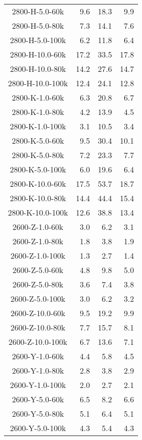 \begin{longtable}{crrr}
    2800-H-5.0-60k &   9.6 &   18.3 &   9.9 \\
    2800-H-5.0-80k &   7.3 &   14.1 &   7.6 \\
    2800-H-5.0-100k &   6.2 &   11.8 &   6.4 \\
    2800-H-10.0-60k &  17.2 &   33.5 &  17.8 \\
    2800-H-10.0-80k &  14.2 &   27.6 &  14.7 \\
    2800-H-10.0-100k &  12.4 &   24.1 &  12.8 \\
    2800-K-1.0-60k &   6.3 &   20.8 &   6.7 \\
    2800-K-1.0-80k &   4.2 &   13.9 &   4.5 \\
    2800-K-1.0-100k &   3.1 &   10.5 &   3.4 \\
    2800-K-5.0-60k &   9.5 &   30.4 &  10.1 \\
    2800-K-5.0-80k &   7.2 &   23.3 &   7.7 \\
    2800-K-5.0-100k &   6.0 &   19.6 &   6.4 \\
    2800-K-10.0-60k &  17.5 &   53.7 &  18.7 \\
    2800-K-10.0-80k &  14.4 &   44.4 &  15.4 \\
    2800-K-10.0-100k &  12.6 &   38.8 &  13.4 \\
    2600-Z-1.0-60k &   3.0 &    6.2 &   3.1 \\
    2600-Z-1.0-80k &   1.8 &    3.8 &   1.9 \\
    2600-Z-1.0-100k &   1.3 &    2.7 &   1.4 \\
    2600-Z-5.0-60k &   4.8 &    9.8 &   5.0 \\
    2600-Z-5.0-80k &   3.6 &    7.4 &   3.8 \\
    2600-Z-5.0-100k &   3.0 &    6.2 &   3.2 \\
    2600-Z-10.0-60k &   9.5 &   19.2 &   9.9 \\
    2600-Z-10.0-80k &   7.7 &   15.7 &   8.1 \\
    2600-Z-10.0-100k &   6.7 &   13.6 &   7.1 \\
    2600-Y-1.0-60k &   4.4 &    5.8 &   4.5 \\
    2600-Y-1.0-80k &   2.8 &    3.8 &   2.9 \\
    2600-Y-1.0-100k &   2.0 &    2.7 &   2.1 \\
    2600-Y-5.0-60k &   6.5 &    8.2 &   6.6 \\
    2600-Y-5.0-80k &   5.1 &    6.4 &   5.1 \\
    2600-Y-5.0-100k &   4.3 &    5.4 &   4.3 \\

\end{longtable}
